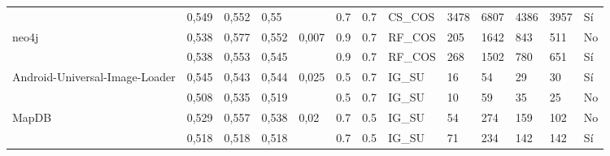 \begin{table}[H]
{\begin{tabular}{lllllllllllll}
                      & 0,549              & 0,552           & 0,55              &                    & 0.7           & 0.7        & CS\_COS                 & 3478        & 6807        & 4386        & 3957        & Sí                \\
neo4j                          & 0,538              & 0,577           & 0,552             & 0,007              & 0.9           & 0.7        & RF\_COS                 & 205         & 1642        & 843         & 511         & No               \\
                          & 0,538              & 0,553           & 0,545             &                    & 0.9           & 0.7        & RF\_COS                 & 268         & 1502        & 780         & 651         & Sí                \\
Android-Universal-Image-Loader & 0,545              & 0,543           & 0,544             & 0,025              & 0.5           & 0.7        & IG\_SU                  & 16          & 54          & 29          & 30          & Sí                \\
 & 0,508              & 0,535           & 0,519             &                    & 0.5           & 0.7        & IG\_SU                  & 10          & 59          & 35          & 25          & No               \\
MapDB                          & 0,529              & 0,557           & 0,538             & 0,02               & 0.7           & 0.5        & IG\_SU                  & 54          & 274         & 159         & 102         & No               \\
                          & 0,518              & 0,518           & 0,518             &                    & 0.7           & 0.5        & IG\_SU                  & 71          & 234         & 142         & 142         & Sí               
\end{tabular}
}
\end{table}